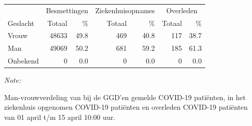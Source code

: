 \documentclass[
  english,
  man,floatsintext]{apa6}
\begin{document}
\begin{table}
\centering\begingroup\fontsize{11}{13}\selectfont

\begin{threeparttable}
\begin{tabular}{lrrrrrr}
\toprule
\multicolumn{1}{c}{ } & \multicolumn{2}{c}{Besmettingen} & \multicolumn{2}{c}{Ziekenhuisopnames} & \multicolumn{2}{c}{Overleden} \\
\cmidrule(l{3pt}r{3pt}){2-3} \cmidrule(l{3pt}r{3pt}){4-5} \cmidrule(l{3pt}r{3pt}){6-7}
Geslacht & Totaal & \% & Totaal & \% & Totaal & \%\\
\midrule
Vrouw & 48633 & 49.8 & 469 & 40.8 & 117 & 38.7\\
Man & 49069 & 50.2 & 681 & 59.2 & 185 & 61.3\\
Onbekend & 0 & 0.0 & 0 & 0.0 & 0 & 0.0\\
\bottomrule
\end{tabular}
\begin{tablenotes}
\item \textit{Note: } 
\item Man-vrouwverdeling van bij de GGD’en gemelde COVID-19 patiënten, in het ziekenhuis opgenomen COVID-19 patiënten en overleden COVID-19 patiënten van 01 april t/m 15 april 10:00 uur.
\end{tablenotes}
\end{threeparttable}
\endgroup{}
\end{table}
\newpage
\end{document}
